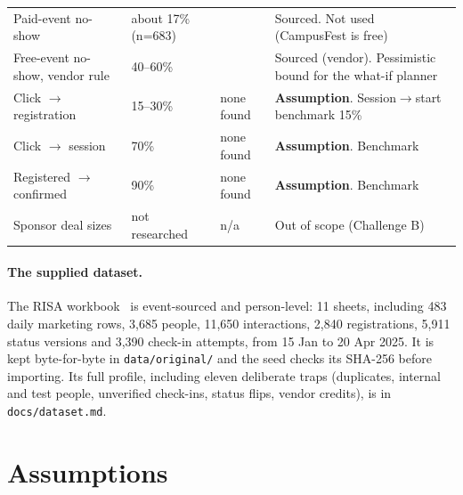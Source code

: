 \documentclass[11pt,a4paper]{article}
\newcommand{\code}[1]{\texttt{#1}}
\begin{document}
\begin{longtable}{@{}p{4.3cm}p{4.0cm}p{1.2cm}p{5.6cm}@{}}
Paid-event no-show & about 17\% (n=683) & \cite{pheedloop5} & Sourced. Not used (CampusFest is free) \\
Free-event no-show, vendor rule & 40--60\% & \cite{nunify} & Sourced (vendor). Pessimistic bound for the what-if planner \\
Click $\to$ registration & 15--30\% & none found & \textbf{Assumption}. Session$\to$start benchmark 15\% \\
Click $\to$ session & 70\% & none found & \textbf{Assumption}. Benchmark \\
Registered $\to$ confirmed & 90\% & none found & \textbf{Assumption}. Benchmark \\
Sponsor deal sizes & not researched & n/a & Out of scope (Challenge B) \\
\bottomrule
\end{longtable}

\paragraph{The supplied dataset.} The RISA workbook~\cite{risa2025assignment} is event-sourced and person-level: 11 sheets, including 483 daily marketing rows, 3,685 people, 11,650 interactions, 2,840 registrations, 5,911 status versions and 3,390 check-in attempts, from 15 Jan to 20 Apr 2025. It is kept byte-for-byte in \code{data/original/} and the seed checks its SHA-256 before importing. Its full profile, including eleven deliberate traps (duplicates, internal and test people, unverified check-ins, status flips, vendor credits), is in \code{docs/dataset.md}.

\section{Assumptions}\label{sec:assumptions}
\end{document}
